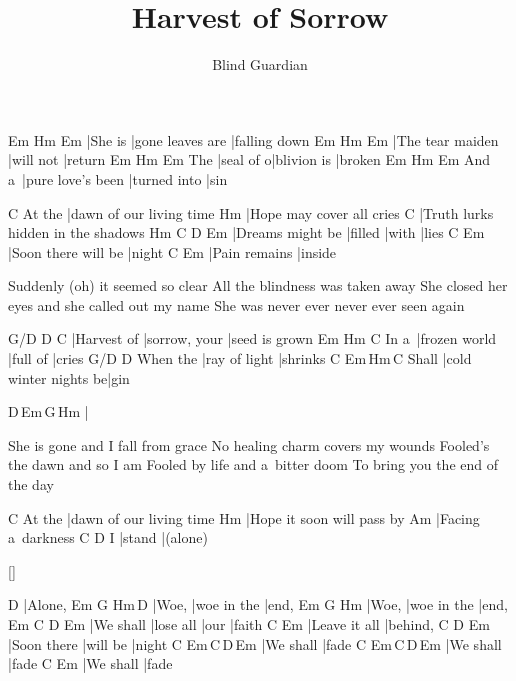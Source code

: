 \documentclass{song}
\title{Harvest of Sorrow}
\author{Blind Guardian}
\begin{document}
\strophe
Em\7    Hm               Em\7     
|She is |gone leaves are |falling down
Em\7             Hm        Em\7
|The tear maiden |will not |return
    Em\7      Hm          Em\7
The |seal of o|blivion is |broken
      Em\7              Hm           Em\7
And a~|pure love's been |turned into |sin
\endstrophe

\strophe
       C
At the |dawn of our living time
Hm
|Hope may cover all cries
C
|Truth lurks hidden in the shadows
Hm               C       D     Em
|Dreams might be |filled |with |lies
C                   Em
|Soon there will be |night
C             Em
|Pain remains |inside
\endstrophe

\strophe*
Suddenly (oh) it seemed so clear
All the blindness was taken away
She closed her eyes and she called out my name
She was never ever never ever seen again
\endstrophe

G/D         D             C
|Harvest of |sorrow, your |seed is grown
     Em            Hm       C
In a~|frozen world |full of |cries
         G/D           D
When the |ray of light |shrinks
      C                     Em\,Hm\,C
Shall |cold winter nights be|gin
\endstrophe

\strophe
D\,Em\,G\,Hm
|
\endstrophe

\strophe*
She is gone and I fall from grace
No healing charm covers my wounds
Fooled's the dawn and so I am
Fooled by life and a~bitter doom
To bring you the end of the day
\endstrophe

\strophe
       C
At the |dawn of our living time
Hm
|Hope it soon will pass by
Am
|Facing a~darkness
  C      D
I |stand |(alone)
\endstrophe

\ref{}

\strophe
D
|Alone,
Em    G           Hm\,D
|Woe, |woe in the |end,
Em    G           Hm
|Woe, |woe in the |end,
Em        C         D    Em
|We shall |lose all |our |faith
C             Em
|Leave it all |behind,
C           D        Em
|Soon there |will be |night
C         Em\,C\,D\,Em
|We shall |fade
C         Em\,C\,D\,Em
|We shall |fade
C         Em
|We shall |fade
\endstrophe
\end{document}
